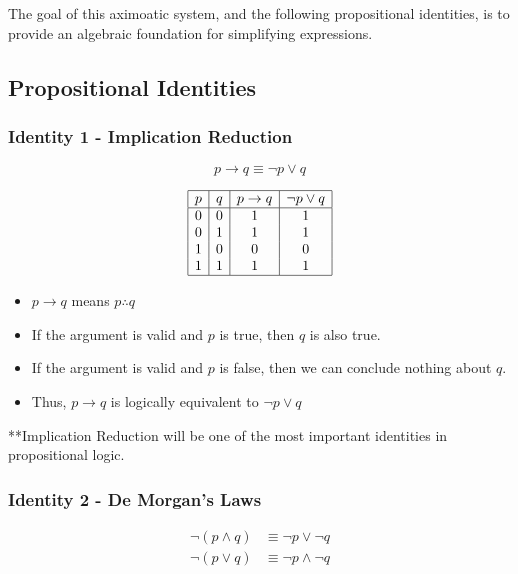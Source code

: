 \documentclass[12pt]{article}
\begin{document}
The goal of this aximoatic system, and the following propositional identities,
is to provide an algebraic foundation for simplifying expressions.

\subsection{Propositional Identities}

\subsubsection{Identity 1 - Implication Reduction}

\begin{equation}
  p \to q \equiv \neg p \lor q
  \label{eq:identity_1}
\end{equation}

\[
\begin{array}{|c|c|c|c|}
\hline
p & q & p \to q & \neg p \lor q \\
\hline
0 & 0 & 1 & 1 \\
0 & 1 & 1 & 1 \\
1 & 0 & 0 & 0 \\
1 & 1 & 1 & 1 \\
\hline
\end{array}
\]

\begin{itemize}
\item $p \to q$ means $p \therefore q$
\item If the argument is valid and $p$ is true, then $q$ is also true.
\item If the argument is valid and $p$ is false, then we can conclude nothing
  about $q$.
\item Thus, $p \to q$ is logically equivalent to $\neg p \lor q$
\end{itemize}

**Implication Reduction will be one of the most important identities in
propositional logic.

\subsubsection{Identity 2 - De Morgan's Laws}

\begin{align}
  \neg (p \land q) &\equiv \neg p \lor \neg q \\
  \neg (p \lor q) &\equiv \neg p \land \neg q
\end{align}
\end{document}
